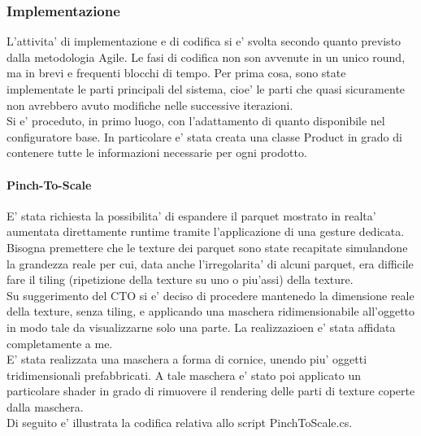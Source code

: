 \subsubsection{Implementazione}
L'attivita' di implementazione e di codifica si e' svolta secondo quanto previsto dalla metodologia Agile. Le fasi di codifica non son avvenute in un unico round, ma in brevi e frequenti blocchi di tempo. Per prima cosa, sono state implementate le parti principali del sistema, cioe' le parti che quasi sicuramente non avrebbero avuto modifiche nelle successive iterazioni.\\

Si e' proceduto, in primo luogo, con l'adattamento di quanto disponibile nel configuratore base. In particolare e' stata creata una classe Product in grado di contenere tutte le informazioni necessarie per ogni prodotto.\\

\paragraph{Pinch-To-Scale}
E' stata richiesta la possibilita' di espandere il parquet mostrato in realta' aumentata direttamente runtime tramite l'applicazione di una gesture dedicata.\\
Bisogna premettere che le texture dei parquet sono state recapitate simulandone la grandezza reale per cui, data anche l'irregolarita' di alcuni parquet, era difficile fare il tiling (ripetizione della texture su uno o piu'assi) della texture.\\
Su suggerimento del CTO si e' deciso di procedere mantenedo la dimensione reale della texture, senza tiling, e applicando una maschera ridimensionabile all'oggetto in modo tale da visualizzarne solo una parte. La realizzazioen e' stata affidata completamente a me.\\
E' stata realizzata una maschera a forma di cornice, unendo piu' oggetti tridimensionali prefabbricati. A tale maschera e' stato poi applicato un particolare shader in grado di rimuovere il rendering delle parti di texture coperte dalla maschera.\\
Di seguito e' illustrata la codifica relativa allo script PinchToScale.cs.

